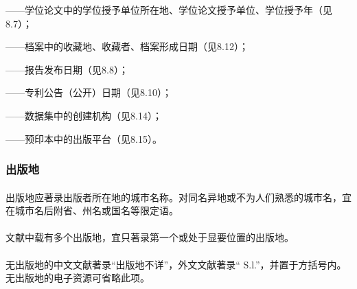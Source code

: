 \documentclass{article}
\begin{document}
——学位论文中的学位授予单位所在地、学位论文授予单位、学位授予年（见8.7）；

——档案中的收藏地、收藏者、档案形成日期（见8.12）；

——报告发布日期（见8.8）；

——专利公告（公开）日期（见8.10）；

——数据集中的创建机构（见8.14）；

——预印本中的出版平台（见8.15）。

\begin{refsection}
\nocite{egbookpuba--}
\nocite{egbookpubb--}
\nocite{egbookpubc--}
\nocite{egbookpubd--}
\nocite{egbookpube--}
{}
\end{refsection}

\subsubsection{出版地}

\paragraph{} 出版地应著录出版者所在地的城市名称。对同名异地或不为人们熟悉的城市名，宜在城市名后附省、州名或国名等限定语。

\begin{refsection}
\nocite{egbookpubaddressa--}
\nocite{egbookpubaddressb--}


{}
\end{refsection}


\paragraph{} 文献中载有多个出版地，宜只著录第一个或处于显要位置的出版地。

\begin{refsection}
\nocite{egbookpubaddressc--}
\nocite{egbookpubaddressd--}


{}
\end{refsection}

\paragraph{} 无出版地的中文文献著录“出版地不详”，外文文献著录“ S.l.”，并置于方括号内。无出版地的电子资源可省略此项。

\begin{refsection}

\nocite{egbookpubaddresse--}
\nocite{egbookpubaddressf--}
\nocite{egbookpubaddressg--}

{}
\end{refsection}
\end{document}
